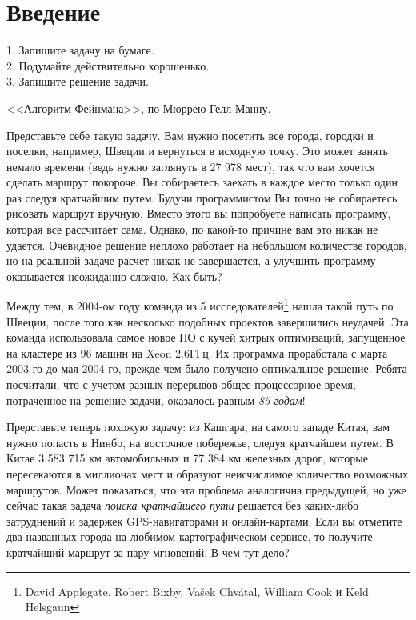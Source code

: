 \chapter{Введение}
\label{chap:intro}

\epigraph{
1. Запишите задачу на бумаге.\\
2. Подумайте действительно хорошенько.\\
3. Запишите решение задачи.
}{<<Алгоритм Фейнмана>>, по Мюррею Гелл-Манну.}


Представьте себе такую задачу. Вам нужно посетить все города, городки и поселки, например, Швеции и вернуться в исходную точку. Это может занять немало времени (ведь нужно заглянуть в 27 978 мест), так что вам хочется сделать маршрут покороче. Вы собираетесь заехать в каждое место только один раз следуя кратчайшим путем. Будучи программистом Вы точно не собираетесь рисовать маршрут вручную. Вместо этого вы попробуете написать программу, которая все рассчитает сама. Однако, по какой-то причине вам это никак не удается. Очевидное решение неплохо работает на небольшом количестве городов, но на реальной задаче расчет никак не завершается, а улучшить программу оказывается неожиданно сложно. Как быть?

Между тем, в 2004-ом году команда из 5 исследователей\footnote{David Applegate, Robert Bixby, Vašek Chvátal, William Cook и Keld Helsgaun} нашла такой путь по Швеции, после того как несколько подобных проектов завершились неудачей. Эта команда использовала самое новое ПО с кучей хитрых оптимизаций, запущенное на кластере из 96 машин на Xeon 2.6ГГц. Их программа проработала с марта 2003-го до мая 2004-го, прежде чем было получено оптимальное решение. Ребята посчитали, что с учетом разных перерывов общее процессорное время, потраченное на решение задачи, оказалось равным \textit{85 годам}!

Представьте теперь похожую задачу: из Кашгара, на самого западе Китая, вам нужно попасть в Нинбо, на восточное побережье, следуя кратчайшем путем. В Китае 3 583 715 км автомобильных и 77 384 км железных дорог, которые пересекаются в миллионах мест и образуют неисчислимое количество возможных маршрутов. Может показаться, что эта проблема аналогична предыдущей, но уже сейчас такая задача \textit{поиска кратчайшего пути} решается без каких-либо затруднений и задержек GPS-навигаторами и онлайн-картами. Если вы отметите два названных города на любимом картографическом сервисе, то получите кратчайший маршрут за пару мгновений. В чем тут дело?

